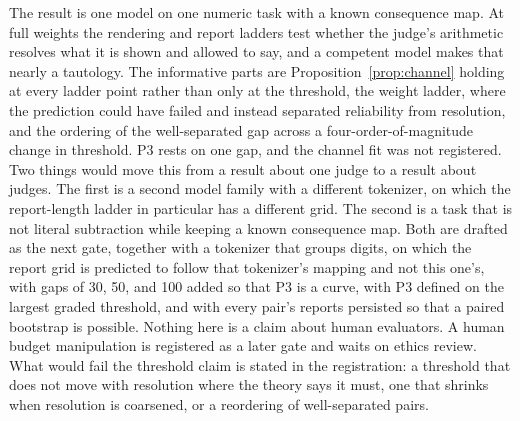 \documentclass{article}
\theoremstyle{definition}
\theoremstyle{remark}
\begin{document}
The result is one model on one numeric task with a known consequence map.
At full weights the rendering and report ladders test whether the judge's arithmetic resolves what it is shown and allowed to say, and a competent model makes that nearly a tautology.
The informative parts are Proposition~\ref{prop:channel} holding at every ladder point rather than only at the threshold, the weight ladder, where the prediction could have failed and instead separated reliability from resolution, and the ordering of the well-separated gap across a four-order-of-magnitude change in threshold.
P3 rests on one gap, and the channel fit was not registered.
Two things would move this from a result about one judge to a result about judges.
The first is a second model family with a different tokenizer, on which the report-length ladder in particular has a different grid.
The second is a task that is not literal subtraction while keeping a known consequence map.
Both are drafted as the next gate, together with a tokenizer that groups digits, on which the report grid is predicted to follow that tokenizer's mapping and not this one's, with gaps of 30, 50, and 100 added so that P3 is a curve, with P3 defined on the largest graded threshold, and with every pair's reports persisted so that a paired bootstrap is possible.
Nothing here is a claim about human evaluators.
A human budget manipulation is registered as a later gate and waits on ethics review.
What would fail the threshold claim is stated in the registration: a threshold that does not move with resolution where the theory says it must, one that shrinks when resolution is coarsened, or a reordering of well-separated pairs.
\end{document}
